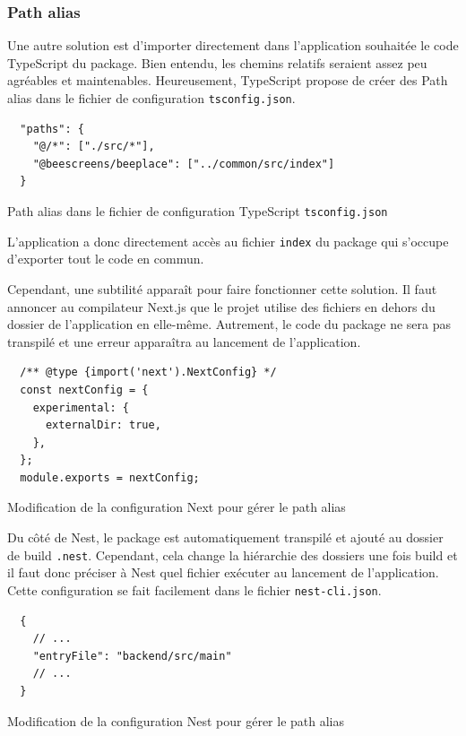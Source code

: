 \subsubsection{Path alias}

Une autre solution est d'importer directement dans l'application souhaitée le code TypeScript du package. Bien entendu, les chemins relatifs seraient assez peu agréables et maintenables. Heureusement, TypeScript propose de créer des Path alias dans le fichier de configuration \texttt{tsconfig.json}.

\begin{listing}[H]
  \begin{verbatim}
  "paths": {
    "@/*": ["./src/*"],
    "@beescreens/beeplace": ["../common/src/index"]
  }
\end{verbatim}
  \caption{Path alias dans le fichier de configuration TypeScript \texttt{tsconfig.json}}
  \label{listing:path-alias-tsconfig}
\end{listing}

L'application a donc directement accès au fichier \texttt{index} du package qui s'occupe d'exporter tout le code en commun.

Cependant, une subtilité apparaît pour faire fonctionner cette solution. Il faut annoncer au compilateur Next.js que le projet utilise des fichiers en dehors du dossier de l'application en elle-même. Autrement, le code du package ne sera pas transpilé et une erreur apparaîtra au lancement de l'application.

\begin{listing}[H]
  \begin{verbatim}
  /** @type {import('next').NextConfig} */
  const nextConfig = {
    experimental: {
      externalDir: true,
    },
  };
  module.exports = nextConfig;
\end{verbatim}
  \caption{Modification de la configuration Next pour gérer le path alias}
  \label{listing:next-external-dir}
\end{listing}

Du côté de Nest, le package est automatiquement transpilé et ajouté au dossier de build \texttt{.nest}. Cependant, cela change la hiérarchie des dossiers une fois build et il faut donc préciser à Nest quel fichier exécuter au lancement de l'application. Cette configuration se fait facilement dans le fichier \texttt{nest-cli.json}.

\begin{listing}[H]
  \begin{verbatim}
  {
    // ...
    "entryFile": "backend/src/main"
    // ...
  }
\end{verbatim}
  \caption{Modification de la configuration Nest pour gérer le path alias}
  \label{listing:nest-entry-file}
\end{listing}

